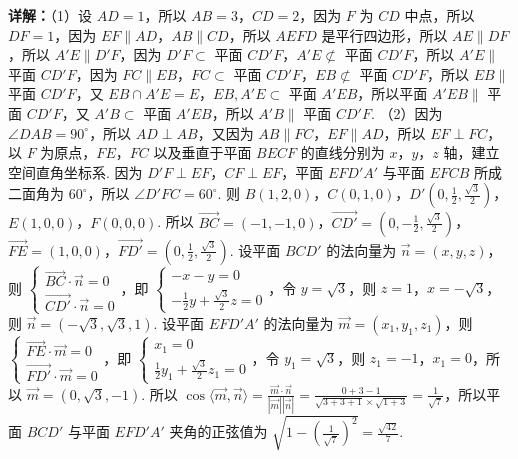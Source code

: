 \begin{question}[points=15]
\begin{solution}
\textbf{详解：}（1）设 $AD=1$，所以 $AB=3$，$CD=2$，因为 $F$ 为 $CD$ 中点，所以 $DF=1$，因为 $EF\parallel AD$，$AB\parallel CD$，所以 $AEFD$ 是平行四边形，所以 $AE\parallel DF$，所以 $A'E\parallel D'F$，因为 $D'F\subset$ 平面 $CD'F$，$A'E\not\subset$ 平面 $CD'F$，所以 $A'E\parallel$ 平面 $CD'F$，因为 $FC\parallel EB$，$FC\subset$ 平面 $CD'F$，$EB\not\subset$ 平面 $CD'F$，所以 $EB\parallel$ 平面 $CD'F$，又 $EB\cap A'E=E$，$EB,A'E\subset$ 平面 $A'EB$，所以平面 $A'EB\parallel$ 平面 $CD'F$，又 $A'B\subset$ 平面 $A'EB$，所以 $A'B\parallel$ 平面 $CD'F$.
（2）因为 $\angle DAB=90^\circ$，所以 $AD\perp AB$，又因为 $AB\parallel FC$，$EF\parallel AD$，所以 $EF\perp FC$，以 $F$ 为原点，$FE$，$FC$ 以及垂直于平面 $BECF$ 的直线分别为 $x$，$y$，$z$ 轴，建立空间直角坐标系. 因为 $D'F\perp EF$，$CF\perp EF$，平面 $EFD'A'$ 与平面 $EFCB$ 所成二面角为 $60^\circ$，所以 $\angle D'FC=60^\circ$. 则 $B(1,2,0)$，$C(0,1,0)$，$D'\left(0,\frac{1}{2},\frac{\sqrt{3}}{2}\right)$，$E(1,0,0)$，$F(0,0,0)$. 所以 $\overrightarrow{BC}=(-1,-1,0)$，$\overrightarrow{CD'}=\left(0,-\frac{1}{2},\frac{\sqrt{3}}{2}\right)$，$\overrightarrow{FE}=(1,0,0)$，$\overrightarrow{FD'}=\left(0,\frac{1}{2},\frac{\sqrt{3}}{2}\right)$. 设平面 $BCD'$ 的法向量为 $\vec{n}=(x,y,z)$，则 $\begin{cases}\overrightarrow{BC}\cdot\vec{n}=0\\\overrightarrow{CD'}\cdot\vec{n}=0\end{cases}$，即 $\begin{cases}-x-y=0\\-\frac{1}{2}y+\frac{\sqrt{3}}{2}z=0\end{cases}$，令 $y=\sqrt{3}$，则 $z=1$，$x=-\sqrt{3}$，则 $\vec{n}=(-\sqrt{3},\sqrt{3},1)$. 设平面 $EFD'A'$ 的法向量为 $\vec{m}=(x_1,y_1,z_1)$，则 $\begin{cases}\overrightarrow{FE}\cdot\vec{m}=0\\\overrightarrow{FD'}\cdot\vec{m}=0\end{cases}$，即 $\begin{cases}x_1=0\\\frac{1}{2}y_1+\frac{\sqrt{3}}{2}z_1=0\end{cases}$，令 $y_1=\sqrt{3}$，则 $z_1=-1$，$x_1=0$，所以 $\vec{m}=(0,\sqrt{3},-1)$. 所以 $\cos\langle\vec{m},\vec{n}\rangle=\frac{\vec{m}\cdot\vec{n}}{|\vec{m}||\vec{n}|}=\frac{0+3-1}{\sqrt{3+3+1}\times\sqrt{1+3}}=\frac{1}{\sqrt{7}}$，所以平面 $BCD'$ 与平面 $EFD'A'$ 夹角的正弦值为 $\sqrt{1-\left(\frac{1}{\sqrt{7}}\right)^2}=\frac{\sqrt{42}}{7}$.
\end{solution}
\end{question}

